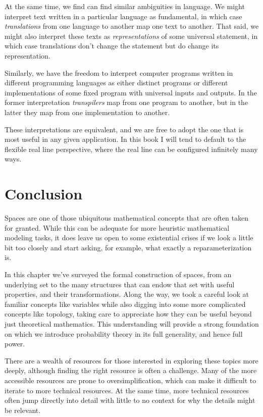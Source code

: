\documentclass[
  letterpaper,
  DIV=11,
  numbers=noendperiod]{scrartcl}
\begin{document}
At the same time, we find can find similar ambiguities in language. We
might interpret text written in a particular language as fundamental, in
which case \emph{translations} from one language to another map one text
to another. That said, we might also interpret these texts as
\emph{representations} of some universal statement, in which case
translations don't change the statement but do change its
representation.

Similarly, we have the freedom to interpret computer programs written in
different programming languages as either distinct programs or different
implementations of some fixed program with universal inputs and outputs.
In the former interpretation \emph{transpilers} map from one program to
another, but in the latter they map from one implementation to another.

These interpretations are equivalent, and we are free to adopt the one
that is most useful in any given application. In this book I will tend
to default to the flexible real line perspective, where the real line
can be configured infinitely many ways.

\section{Conclusion}\label{conclusion}

Spaces are one of those ubiquitous mathematical concepts that are often
taken for granted. While this can be adequate for more heuristic
mathematical modeling tasks, it does leave us open to some existential
crises if we look a little bit too closely and start asking, for
example, what exactly a reparameterization is.

In this chapter we've surveyed the formal construction of spaces, from
an underlying set to the many structures that can endow that set with
useful properties, and their transformations. Along the way, we took a
careful look at familiar concepts like variables while also digging into
some more complicated concepts like topology, taking care to appreciate
how they can be useful beyond just theoretical mathematics. This
understanding will provide a strong foundation on which we introduce
probability theory in its full generality, and hence full power.

There are a wealth of resources for those interested in exploring these
topics more deeply, although finding the right resource is often a
challenge. Many of the more accessible resources are prone to
oversimplification, which can make it difficult to iterate to more
technical resources. At the same time, more technical resources often
jump directly into detail with little to no context for why the details
might be relevant.
\end{document}
